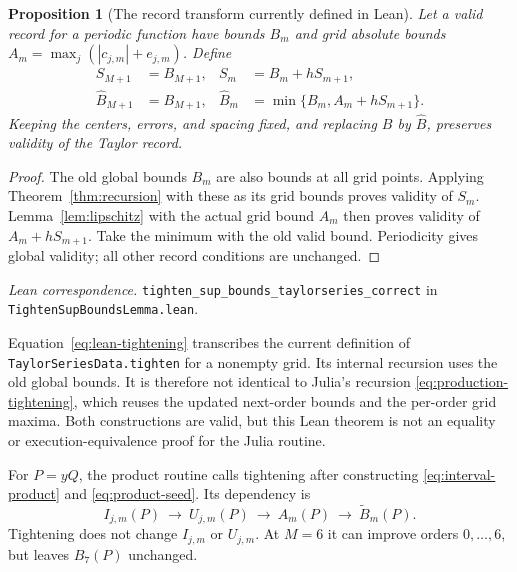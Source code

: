 \documentclass[11pt]{article}
\newtheorem{proposition}[theorem]{Proposition}
\theoremstyle{definition}
\theoremstyle{remark}
\newcommand{\code}[1]{\nolinkurl{#1}}
\newcommand{\leanref}[2]{\par\smallskip\noindent\textit{Lean correspondence.}
  \code{#1} in \code{#2}.\par\smallskip}
\numberwithin{equation}{section}
\begin{document}
\begin{proposition}[The record transform currently defined in Lean]
\label{prop:lean-tightening}
Let a valid record for a periodic function have bounds $B_m$ and grid
absolute bounds $A_m=\max_j(|c_{j,m}|+e_{j,m})$. Define
\begin{equation}
 \begin{aligned}
 S_{M+1}&=B_{M+1},& S_m&=B_m+hS_{m+1},\\
 \widehat B_{M+1}&=B_{M+1},&
 \widehat B_m&=\min\{B_m,A_m+hS_{m+1}\}.
 \end{aligned}
 \label{eq:lean-tightening}
\end{equation}
Keeping the centers, errors, and spacing fixed, and replacing $B$ by
$\widehat B$, preserves validity of the Taylor record.
\end{proposition}
\begin{proof}
The old global bounds $B_m$ are also bounds at all grid points. Applying
Theorem~\ref{thm:recursion} with these as its grid bounds proves validity
of $S_m$. Lemma~\ref{lem:lipschitz} with the actual grid bound $A_m$ then
proves validity of $A_m+hS_{m+1}$. Take the minimum with the old valid
bound. Periodicity gives global validity; all other record conditions are
unchanged.
\end{proof}
\leanref{tighten_sup_bounds_taylorseries_correct}{TightenSupBoundsLemma.lean}
Equation~\eqref{eq:lean-tightening} transcribes the current definition of
\code{TaylorSeriesData.tighten} for a nonempty grid. Its internal recursion
uses the old global bounds. It is therefore not identical to Julia's
recursion \eqref{eq:production-tightening}, which reuses the updated
next-order bounds and the per-order grid maxima. Both constructions are
valid, but this Lean theorem is not an equality or execution-equivalence
proof for the Julia routine.

For $P=yQ$, the product routine calls tightening after constructing
\eqref{eq:interval-product} and \eqref{eq:product-seed}. Its dependency is
\begin{equation}
 I_{j,m}(P)\ \longrightarrow\ U_{j,m}(P)\ \longrightarrow\
 A_m(P)\ \longrightarrow\ \widetilde B_m(P).
\end{equation}
Tightening does not change $I_{j,m}$ or $U_{j,m}$. At $M=6$ it can improve
orders $0,\ldots,6$, but leaves $B_7(P)$ unchanged.
\end{document}
